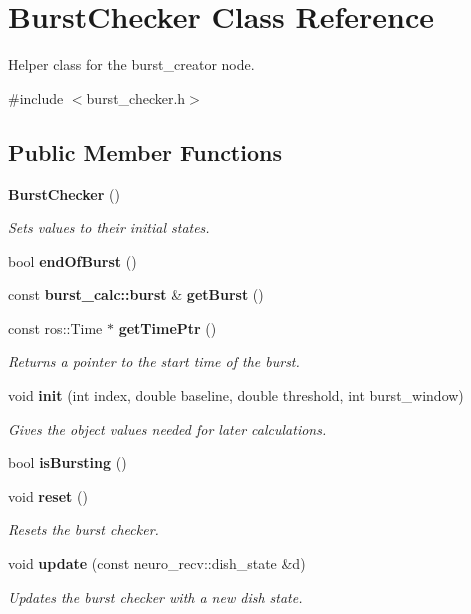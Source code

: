 \section{\-Burst\-Checker \-Class \-Reference}
\label{classBurstChecker}


\-Helper class for the burst\-\_\-creator node.  




{\ttfamily \#include $<$burst\-\_\-checker.\-h$>$}

\subsection*{\-Public \-Member \-Functions}
\begin{DoxyCompactItemize}
\item 
{\bf \-Burst\-Checker} ()
\begin{DoxyCompactList}\small\item\em \-Sets values to their initial states. \end{DoxyCompactList}\item 
bool {\bf end\-Of\-Burst} ()
\item 
const {\bf burst\-\_\-calc\-::burst} \& {\bf get\-Burst} ()
\item 
const ros\-::\-Time $\ast$ {\bf get\-Time\-Ptr} ()
\begin{DoxyCompactList}\small\item\em \-Returns a pointer to the start time of the burst. \end{DoxyCompactList}\item 
void {\bf init} (int index, double baseline, double threshold, int burst\-\_\-window)
\begin{DoxyCompactList}\small\item\em \-Gives the object values needed for later calculations. \end{DoxyCompactList}\item 
bool {\bf is\-Bursting} ()
\item 
void {\bf reset} ()
\begin{DoxyCompactList}\small\item\em \-Resets the burst checker. \end{DoxyCompactList}\item 
void {\bf update} (const neuro\-\_\-recv\-::dish\-\_\-state \&d)
\begin{DoxyCompactList}\small\item\em \-Updates the burst checker with a new dish state. \end{DoxyCompactList}\end{DoxyCompactItemize}
